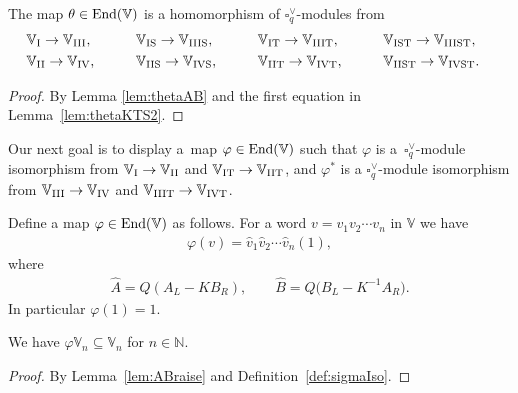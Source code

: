\begin{Lemma}\label{lem:thetamix} The map $\theta \in {\rm End}(\mathbb V)$ is a homomorphism of $\square^\vee_q$-modules from
\begin{alignat*}{5}
&
\mathbb V_{\rm I} \rightarrow \mathbb V_{\rm III}, \qquad &&
\mathbb V_{\rm IS} \rightarrow \mathbb V_{\rm IIIS}, \qquad &&
\mathbb V_{\rm IT} \rightarrow\mathbb V_{\rm IIIT}, \qquad &&
\mathbb V_{\rm IST} \rightarrow \mathbb V_{\rm IIIST},&
\\
&\mathbb V_{\rm II} \rightarrow \mathbb V_{\rm IV}, \qquad &&
\mathbb V_{\rm IIS} \rightarrow \mathbb V_{\rm IVS}, \qquad &&
\mathbb V_{\rm IIT} \rightarrow \mathbb V_{\rm IVT}, \qquad &&
\mathbb V_{\rm IIST} \rightarrow \mathbb V_{\rm IVST}.&
\end{alignat*}
\end{Lemma}
\begin{proof} By Lemma \ref{lem:thetaAB} and the first equation in Lemma~\ref{lem:thetaKTS2}.
\end{proof}

Our next goal is to display a~map $\varphi \in {\rm End}(\mathbb V)$ such that $\varphi$ is a~$\square^\vee_q$-module isomorphism from $\mathbb V_{\rm I}\to \mathbb V_{\rm II}$ and $\mathbb V_{\rm IT}\to \mathbb V_{\rm IIT}$, and $\varphi^*$ is a $\square^\vee_q$-module isomorphism from $\mathbb V_{\rm III}\to \mathbb V_{\rm IV}$ and $\mathbb V_{\rm IIIT}\to \mathbb V_{\rm IVT}$.

\begin{Definition}\label{def:sigmaIso}Define a map $\varphi \in {\rm End}(\mathbb V)$ as follows. For a word $v=v_1v_2\cdots v_n$ in $\mathbb V$ we have
\begin{gather}\label{eq:sigIso}
\varphi(v) =\widehat v_1\widehat v_2\cdots\widehat v_n (1),
\end{gather}
where
\begin{gather}\label{eq:widehatAB}
\widehat A = Q(A_L-KB_R), \qquad
\widehat B = Q\big(B_L-K^{-1}A_R\big).
\end{gather}
In particular $\varphi (1)=1$.
\end{Definition}

\begin{Lemma}\label{lem:sigmaAct}We have $\varphi \mathbb V_n \subseteq \mathbb V_n$ for $n\in \mathbb N$.
\end{Lemma}
\begin{proof} By Lemma~\ref{lem:ABraise} and Definition~\ref{def:sigmaIso}.
\end{proof}

